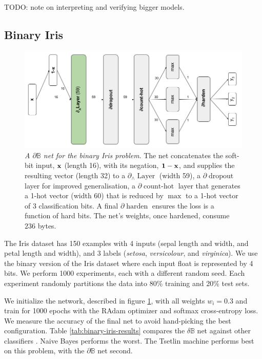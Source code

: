 \documentclass{article} %
\begin{document}
TODO: note on interpreting and verifying bigger models.

\subsection{Binary Iris}

\begin{figure}[t!]
	\centering
	\includegraphics[width=1.0\textwidth]{binary-iris-architecture.png}
	\caption{{\em A $\partial\mathbb{B}$ net for the binary Iris problem}. The net concatenates the soft-bit input, ${\bf x}$ (length 16), with its negation, ${\bf 1 - x}$, and supplies the resulting vector (length 32) to a $\partial_{\wedge}\!\operatorname{Layer}$ (width 59), a $\partial\!\operatorname{dropout}$ layer for improved generalisation, a $\partial\!\operatorname{count-hot}$ layer that generates a 1-hot vector (width 60) that is reduced by $\operatorname{max}$ to a 1-hot vector of 3 classification bits. A final $\partial\!\operatorname{harden}$ ensures the loss is a function of hard bits. The net's weights, once hardened, consume $236$ bytes.}
	\label{fig:binary-iris-architecture}
\end{figure}

The Iris dataset has 150 examples with 4 inputs (sepal length and width, and petal length and width), and 3 labels ({\em setosa}, {\em versicolour}, and {\em virginica}). We use the binary version of the Iris dataset \citep{binary-iris-dataset} where each input float is represented by 4 bits. We perform 1000 experiments, each with a different random seed. Each experiment randomly partitions the data into 80\% training and 20\% test sets. 

We initialize the network, described in figure \ref{fig:binary-iris-architecture}, with all weights $w_{i} = 0.3$ and train for 1000 epochs with the RAdam optimizer and softmax cross-entropy loss. We measure the accuracy of the final net to avoid hand-picking the best configuration. Table \ref{tab:binary-iris-results} compares the $\delta\mathbb{B}$ net against other classifiers  \citep{granmo18}. Naive Bayes performs the worst. The Tsetlin machine performs best on this problem, with the $\partial\mathbb{B}$ net second.
\end{document}
